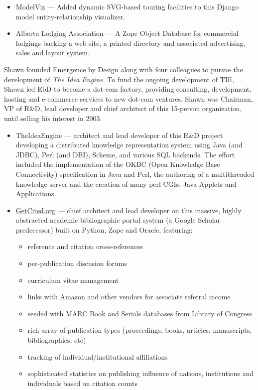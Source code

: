 \documentclass[line,margin,hidelinks]{res}
\begin{document}
\begin{resume}
\begin{position}
\begin{itemize}
  \item ModelViz --- Added dynamic SVG-based touring facilities to this Django
  model entity-relationship visualizer.

\item Alberta Lodging Association --- A Zope Object Database for commercial
  lodgings backing a web site, a printed directory and associated
  advertising, sales and layout system.

\end{itemize}
\end{position}



\begin{position}
  Shawn founded Emergence by Design along with four colleagues to pursue
  the development of \emph{The Idea Engine}.  To fund the ongoing development of
  TIE, Shawn led EbD to become a dot-com factory, providing consulting,
  development, hosting and e-commerce services to new dot-com ventures.
  Shawn was Chairman, VP of R\&D, lead developer and chief architect of this
  15-person organization, until selling his interest in 2003.

\begin{itemize}

\item TheIdeaEngine --- architect and lead developer of this R\&D project
  developing a distributed knowledge representation system using
  Java (and JDBC), Perl (and DBI), Scheme, and various SQL backends.
  The effort included the
  implementation of the OKBC (Open Knowledge Base Connectivity)
  specification in Java and Perl,
  the authoring of a multithreaded knowledge server
  and the creation of many perl CGIs, Java Applets and Applications.

\item \href{https://web.archive.org/web/20140517102110/http://getcited.org/}{GetCited.org}
  --- chief architect and lead developer on this massive, highly abstracted
  academic bibliographic portal system (a Google Scholar predecessor) built on
  Python, Zope and Oracle, featuring:
  \begin{itemize}
    \item reference and citation cross-references
    \item per-publication discusion forums
    \item curriculum vitae management
    \item links with Amazon and other vendors for associate
    referral income
    \item seeded with MARC Book and Serials databases from Library of Congress
    \item rich array of publication types (proceedings, books, articles,
       manuscripts, bibliographies, etc)
    \item tracking of individual/institutional affiliations
    \item sophisticated statistics on publishing influence of
       nations, institutions and individuals based on citation counts
  \end{itemize}


\end{itemize}
\end{position}
\end{resume}
\end{document}
